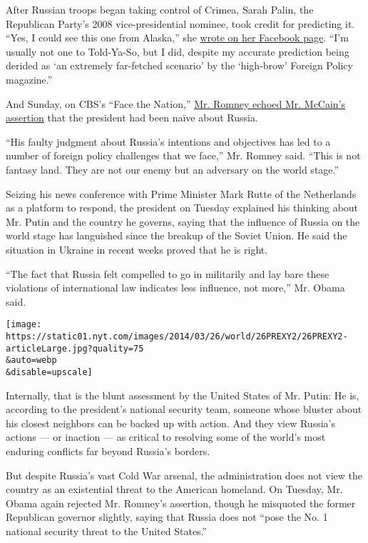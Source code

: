 After Russian troops began taking control of Crimea, Sarah Palin, the
Republican Party's 2008 vice-presidential nominee, took credit for
predicting it. ``Yes, I could see this one from Alaska,'' she
\href{https://www.facebook.com/sarahpalin/posts/10201573917093799}{wrote
on her Facebook page}. ``I'm usually not one to Told-Ya-So, but I did,
despite my accurate prediction being derided as `an extremely
far-fetched scenario' by the `high-brow' Foreign Policy magazine.''

And Sunday, on CBS's ``Face the Nation,''
\href{http://www.cbsnews.com/news/mitt-romney-slams-obama-for-naivete-in-russian-relations/}{Mr.
Romney echoed Mr. McCain's assertion} that the president had been naïve
about Russia.

``His faulty judgment about Russia's intentions and objectives has led
to a number of foreign policy challenges that we face,'' Mr. Romney
said. ``This is not fantasy land. They are not our enemy but an
adversary on the world stage.''

Seizing his news conference with Prime Minister Mark Rutte of the
Netherlands as a platform to respond, the president on Tuesday explained
his thinking about Mr. Putin and the country he governs, saying that the
influence of Russia on the world stage has languished since the breakup
of the Soviet Union. He said the situation in Ukraine in recent weeks
proved that he is right.

``The fact that Russia felt compelled to go in militarily and lay bare
these violations of international law indicates less influence, not
more,'' Mr. Obama said.

\texttt{[image: https://static01.nyt.com/images/2014/03/26/world/26PREXY2/26PREXY2-articleLarge.jpg?quality=75\\\&auto=webp\\\&disable=upscale]}

Internally, that is the blunt assessment by the United States of Mr.
Putin: He is, according to the president's national security team,
someone whose bluster about his closest neighbors can be backed up with
action. And they view Russia's actions --- or inaction --- as critical
to resolving some of the world's most enduring conflicts far beyond
Russia's borders.

But despite Russia's vast Cold War arsenal, the administration does not
view the country as an existential threat to the American homeland. On
Tuesday, Mr. Obama again rejected Mr. Romney's assertion, though he
misquoted the former Republican governor slightly, saying that Russia
does not ``pose the No. 1 national security threat to the United
States.''

